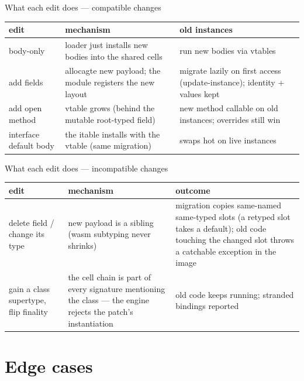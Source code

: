 \documentclass[10pt,presentation]{beamer}
\begin{document}
\begin{frame}[label={sec:org993b4b7}]{What each edit does — compatible changes}
\begin{center}
\scriptsize
\begin{tabular}{p{} p{} p{}}
edit & mechanism & old instances\\
\hline
body-only & loader just installs new bodies into the shared cells & run new bodies via vtables\\
add fields & allocagte new payload; the module registers the new layout & migrate lazily on first access (update-instance); identity + values kept\\
add open method & vtable grows (behind the mutable root-typed field) & new method callable on old instances; overrides still win\\
interface default body & the itable installs with the vtable (same migration) & swaps hot on live instances\\
\end{tabular}
\end{center}
\end{frame}
\begin{frame}[label={sec:orgf90fb65}]{What each edit does — incompatible changes}
\begin{center}
\scriptsize
\begin{tabular}{p{} p{} p{}}
edit & mechanism & outcome\\
\hline
delete field / change its type & new payload is a \alert{sibling} (wasm subtyping never shrinks) & migration copies same-named same-typed slots (a retyped slot takes a default); old code touching the changed slot \alert{throws a catchable exception} in the image\\
gain a class supertype, flip finality & the cell chain is part of every signature mentioning the class — the engine rejects the patch's instantiation & old code keeps running; stranded bindings reported\\
\end{tabular}
\end{center}
\end{frame}
\section*{Edge cases}
\label{sec:orgda5e1e5}
\end{document}
